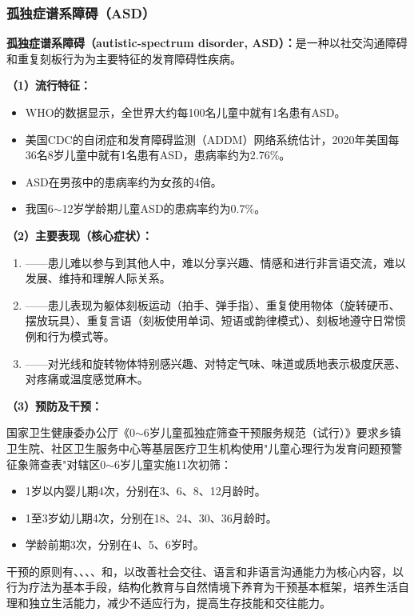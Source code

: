 \subsubsection{孤独症谱系障碍（ASD）}

\begin{keybox}
\textbf{孤独症谱系障碍（autistic-spectrum disorder, ASD）：}是一种以社交沟通障碍和重复刻板行为为主要特征的发育障碍性疾病。

\vspace{4pt}
\textbf{（1）流行特征：}

\begin{itemize}[leftmargin=*]
    \item WHO的数据显示，全世界大约每100名儿童中就有1名患有ASD。
    \item 美国CDC的自闭症和发育障碍监测（ADDM）网络系统估计，2020年美国每36名8岁儿童中就有1名患有ASD，患病率约为2.76\%。
    \item ASD在男孩中的患病率约为女孩的4倍。
    \item 我国6$\sim$12岁学龄期儿童ASD的患病率约为0.7\%。
\end{itemize}

\vspace{4pt}
\textbf{（2）主要表现（核心症状）：}

\begin{enumerate}[leftmargin=*]
    \item {}——患儿难以参与到其他人中，难以分享兴趣、情感和进行非言语交流，难以发展、维持和理解人际关系。
    \item {}——患儿表现为躯体刻板运动（拍手、弹手指）、重复使用物体（旋转硬币、摆放玩具）、重复言语（刻板使用单词、短语或韵律模式）、刻板地遵守日常惯例和行为模式等。
    \item {}——对光线和旋转物体特别感兴趣、对特定气味、味道或质地表示极度厌恶、对疼痛或温度感觉麻木。
\end{enumerate}

\vspace{4pt}
\textbf{（3）预防及干预：}

国家卫生健康委办公厅《0$\sim$6岁儿童孤独症筛查干预服务规范（试行）》要求乡镇卫生院、社区卫生服务中心等基层医疗卫生机构使用"儿童心理行为发育问题预警征象筛查表"对辖区0$\sim$6岁儿童实施11次初筛：
\begin{itemize}[leftmargin=*]
    \item 1岁以内婴儿期4次，分别在3、6、8、12月龄时。
    \item 1至3岁幼儿期4次，分别在18、24、30、36月龄时。
    \item 学龄前期3次，分别在4、5、6岁时。
\end{itemize}

干预的原则有、、、、和，以改善社会交往、语言和非语言沟通能力为核心内容，以行为疗法为基本手段，结构化教育与自然情境下养育为干预基本框架，培养生活自理和独立生活能力，减少不适应行为，提高生存技能和交往能力。
\end{keybox}

